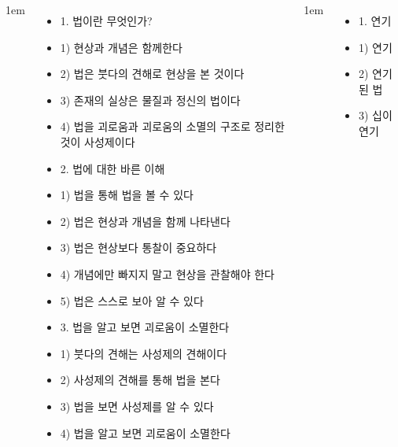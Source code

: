 \documentclass[	14pt, 
							a1paper, 
							portrait, %
							margin=0mm, %
							innermargin=10mm,  		%
							colspace=5mm, 
							subcolspace=0mm
							]{tikzposter}
\begin{document}
\begin{columns}
			{
					\setlength{\leftmargini}{2em}
					\setlength{\labelsep} {1em}
					\begin{itemize}

					\item 1. 법이란 무엇인가?
					\item 1) 현상과 개념은 함께한다
					\item 2) 법은 붓다의 견해로 현상을 본 것이다
					\item 3) 존재의 실상은 물질과 정신의 법이다
					\item 4) 법을 괴로움과 괴로움의 소멸의 구조로 정리한 것이 사성제이다

					\item 2. 법에 대한 바른 이해
					\item 1) 법을 통해 법을 볼 수 있다
					\item 2) 법은 현상과 개념을 함께 나타낸다
					\item 3) 법은 현상보다 통찰이 중요하다
					\item 4) 개념에만 빠지지 말고 현상을 관찰해야 한다
					\item 5) 법은 스스로 보아 알 수 있다

					\item 3. 법을 알고 보면 괴로움이 소멸한다
					\item 1) 붓다의 견해는 사성제의 견해이다
					\item 2) 사성제의 견해를 통해 법을 본다
					\item 3) 법을 보면 사성제를 알 수 있다
					\item 4) 법을 알고 보면 괴로움이 소멸한다
					\end{itemize}

			}



			{
					\setlength{\leftmargini}{2em}
					\setlength{\labelsep} {1em}
					\begin{itemize}
					\item 1. 연기
					\item 1) 연기
					\item 2) 연기된 법
					\item 3) 십이연기


\end{itemize}}
\end{columns}
\end{document}

